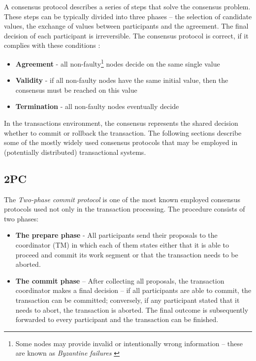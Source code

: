 \documentclass[oneside,
  digital, %
  table,   %
  lof,     %
  lot,     %
]{fithesis3}
\begin{document}
A consensus protocol describes a series of steps that solve the consensus problem. These steps can be typically divided into three phases -- the selection of candidate values, the exchange of values between participants and the agreement. The final decision of each participant is irreversible. The consensus protocol is correct, if it complies with these conditions \cite{distributed-computing}:

\begin{itemize}
    \item \textbf{Agreement} - all non-faulty\footnote{Some nodes may provide invalid or intentionally wrong information -- these are known as \textit{Byzantine failures} \cite{byzantine-generals-problem}} nodes decide on the same single value
    \item \textbf{Validity} - if all non-faulty nodes have the same initial value, then the consensus must be reached on this value
    \item \textbf{Termination} - all non-faulty nodes eventually decide
\end{itemize}


In the transactions environment, the consensus represents the shared decision whether to commit or rollback the transaction. The following sections describe some of the mostly widely used consensus protocols that may be employed in (potentially distributed) transactional systems.

\subsection{2PC}

The \textit{Two-phase commit protocol} is one of the most known employed consensus protocols used not only in the transaction processing. The procedure consists of two phases:

\begin{itemize}
    \item \textbf{The prepare phase} - All participants send their proposals to the coordinator (TM) in which each of them states either that it is able to proceed and commit its work segment or that the transaction needs to be aborted.
    
    \item \textbf{The commit phase} -- After collecting all proposals, the transaction coordinator makes a final decision -- if all participants are able to commit, the transaction can be committed; conversely, if any participant stated that it needs to abort, the transaction is aborted. The final outcome is subsequently forwarded to every participant and the transaction can be finished.
\end{itemize}
\end{document}
